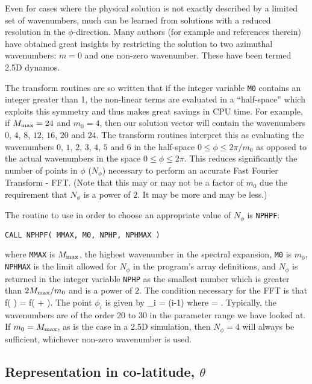 Even for cases where the physical solution is not
exactly described by a limited set of wavenumbers,
much can be learned from solutions with a reduced
resolution in the $\phi$-direction.
Many authors (for example \cite{sarsonjones99} and
references therein) have obtained great insights
by restricting the solution to two azimuthal
wavenumbers: $m=0$ and one non-zero wavenumber.
These have been termed 2.5D dynamos.

The transform routines are so written that if
the integer variable \verb+M0+ contains an integer
greater than 1, the non-linear terms are evaluated 
in a ``half-space'' which exploits this symmetry
and thus makes great savings in CPU time.
For example, if $M_{\rm max} = 24$ and $m_0 = 4$,
then our solution vector will contain the wavenumbers
$0$, $4$, $8$, $12$, $16$, $20$ and $24$.
The transform routines interpret this as evaluating
the wavenumbers $0$, $1$, $2$, $3$, $4$, $5$ and $6$
in the half-space $0 \leq \phi \leq 2 \pi / m_0$ as opposed to the
actual wavenumbers in the space $0 \leq \phi \leq 2 \pi$.
This reduces significantly the number of points in $\phi$ ($N_{\phi}$)
necessary to perform an accurate Fast Fourier Transform - FFT.
(Note that this may or may not be a factor of $m_0$ due
the requirement that $N_{\phi}$ is a power of $2$. It may be
more and may be less.)

The routine to use in order to choose an
appropriate value of $N_{\phi}$ is \verb+NPHPF+:
\begin{verbatim}
CALL NPHPF( MMAX, M0, NPHP, NPHMAX )
\end{verbatim}
where \verb+MMAX+ is $M_{\rm max}$, the highest
wavenumber in the spectral expansion, 
\verb+M0+ is $m_0$, \verb+NPHMAX+ is the limit
allowed for $N_{\phi}$ in the program's array
definitions, and $N_{\phi}$ is returned in
the integer variable \verb+NPHP+ as the smallest
number which is greater than $2 M_{\rm max} / m_0$ and
is a power of $2$.
The condition necessary for the FFT is that
\beq
f( \phi ) = f( \phi +  ).
\eeq
The point $\phi_i$ is given by
\beq
\phi_i = (i-1) \Delta \phi
\eeq
where
\beq
\Delta \phi = .
\eeq
Typically, the wavenumbers
are of the order $20$ to $30$ in the parameter
range we have looked at. If $m_0 = M_{\rm max}$, as
is the case in a 2.5D simulation, then $N_{\phi} = 4$
will always be sufficient, whichever non-zero wavenumber
is used.

\subsection{Representation in co-latitude, $\theta$}

